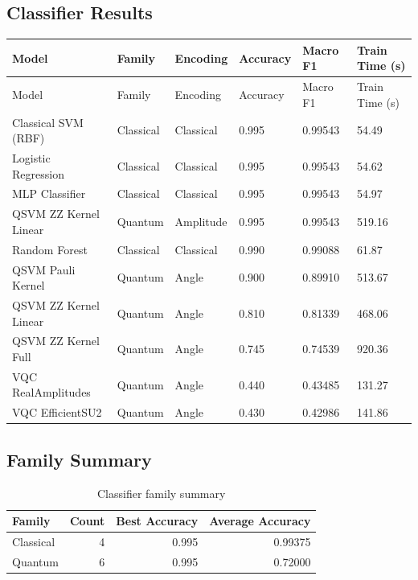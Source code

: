 \documentclass[12pt,a4paper]{article}
\begin{document}
\subsection{Classifier Results}

\begin{longtable}{p{4.3cm}p{1.8cm}p{1.8cm}p{1.5cm}p{1.5cm}p{1.8cm}}
\toprule
Model & Family & Encoding & Accuracy & Macro F1 & Train Time (s) \\
\midrule
\endfirsthead
\toprule
Model & Family & Encoding & Accuracy & Macro F1 & Train Time (s) \\
\midrule
\endhead
Classical SVM (RBF) & Classical & Classical & 0.995 & 0.99543 & 54.49 \\
Logistic Regression & Classical & Classical & 0.995 & 0.99543 & 54.62 \\
MLP Classifier & Classical & Classical & 0.995 & 0.99543 & 54.97 \\
QSVM ZZ Kernel Linear & Quantum & Amplitude & 0.995 & 0.99543 & 519.16 \\
Random Forest & Classical & Classical & 0.990 & 0.99088 & 61.87 \\
QSVM Pauli Kernel & Quantum & Angle & 0.900 & 0.89910 & 513.67 \\
QSVM ZZ Kernel Linear & Quantum & Angle & 0.810 & 0.81339 & 468.06 \\
QSVM ZZ Kernel Full & Quantum & Angle & 0.745 & 0.74539 & 920.36 \\
VQC RealAmplitudes & Quantum & Angle & 0.440 & 0.43485 & 131.27 \\
VQC EfficientSU2 & Quantum & Angle & 0.430 & 0.42986 & 141.86 \\
\bottomrule
\end{longtable}

\subsection{Family Summary}

\begin{table}[h!]
\centering
\begin{tabular}{lrrr}
\toprule
Family & Count & Best Accuracy & Average Accuracy \\
\midrule
Classical & 4 & 0.995 & 0.99375 \\
Quantum & 6 & 0.995 & 0.72000 \\
\bottomrule
\end{tabular}
\caption{Classifier family summary}
\end{table}
\end{document}
